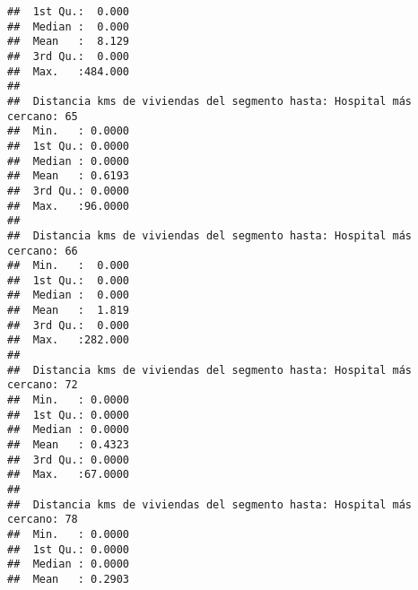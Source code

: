 \documentclass[11pt,]{article}
\begin{document}
\begin{verbatim}
##  1st Qu.:  0.000                                                        
##  Median :  0.000                                                        
##  Mean   :  8.129                                                        
##  3rd Qu.:  0.000                                                        
##  Max.   :484.000                                                        
##                                                                         
##  Distancia kms de viviendas del segmento hasta: Hospital más cercano: 65
##  Min.   : 0.0000                                                        
##  1st Qu.: 0.0000                                                        
##  Median : 0.0000                                                        
##  Mean   : 0.6193                                                        
##  3rd Qu.: 0.0000                                                        
##  Max.   :96.0000                                                        
##                                                                         
##  Distancia kms de viviendas del segmento hasta: Hospital más cercano: 66
##  Min.   :  0.000                                                        
##  1st Qu.:  0.000                                                        
##  Median :  0.000                                                        
##  Mean   :  1.819                                                        
##  3rd Qu.:  0.000                                                        
##  Max.   :282.000                                                        
##                                                                         
##  Distancia kms de viviendas del segmento hasta: Hospital más cercano: 72
##  Min.   : 0.0000                                                        
##  1st Qu.: 0.0000                                                        
##  Median : 0.0000                                                        
##  Mean   : 0.4323                                                        
##  3rd Qu.: 0.0000                                                        
##  Max.   :67.0000                                                        
##                                                                         
##  Distancia kms de viviendas del segmento hasta: Hospital más cercano: 78
##  Min.   : 0.0000                                                        
##  1st Qu.: 0.0000                                                        
##  Median : 0.0000                                                        
##  Mean   : 0.2903                                                        

\end{verbatim}
\end{document}
